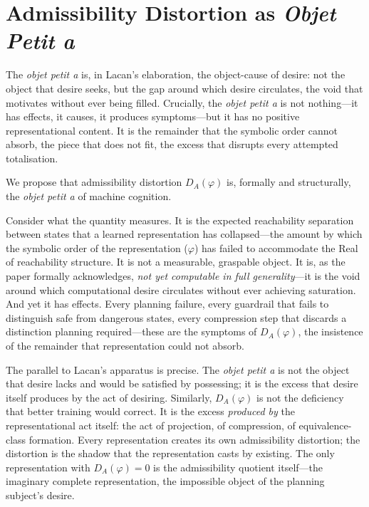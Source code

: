 \documentclass[10pt,a4paper]{article}
\begin{document}
\section{Admissibility Distortion as \emph{Objet Petit a}}

The \emph{objet petit a} is, in Lacan's elaboration, the object-cause of desire:
not the object that desire seeks, but the gap around which desire circulates,
the void that motivates without ever being filled. Crucially, the \emph{objet
petit a} is not nothing---it has effects, it causes, it produces symptoms---but
it has no positive representational content. It is the remainder that the symbolic
order cannot absorb, the piece that does not fit, the excess that disrupts every
attempted totalisation.

We propose that admissibility distortion $D_A(\varphi)$ is, formally and
structurally, the \emph{objet petit a} of machine cognition.

Consider what the quantity measures. It is the expected reachability separation
between states that a learned representation has collapsed---the amount by which
the symbolic order of the representation ($\varphi$) has failed to accommodate
the Real of reachability structure. It is not a measurable, graspable object.
It is, as the paper formally acknowledges, \emph{not yet computable in full
generality}---it is the void around which computational desire circulates without
ever achieving saturation. And yet it has effects. Every planning failure, every
guardrail that fails to distinguish safe from dangerous states, every compression
step that discards a distinction planning required---these are the symptoms of
$D_A(\varphi)$, the insistence of the remainder that representation could not
absorb.

The parallel to Lacan's apparatus is precise. The \emph{objet petit a} is
not the object that desire lacks and would be satisfied by possessing; it is
the excess that desire itself produces by the act of desiring. Similarly,
$D_A(\varphi)$ is not the deficiency that better training would correct. It is
the excess \emph{produced by} the representational act itself: the act of
projection, of compression, of equivalence-class formation. Every representation
creates its own admissibility distortion; the distortion is the shadow that
the representation casts by existing. The only representation with
$D_A(\varphi) = 0$ is the admissibility quotient itself---the imaginary complete
representation, the impossible object of the planning subject's desire.
\end{document}
